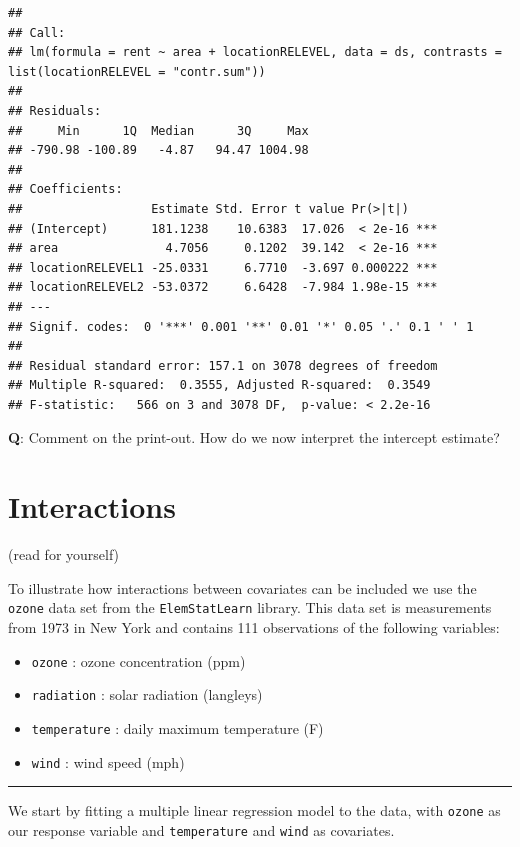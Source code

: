 \documentclass[
]{article}
\providecommand{\tightlist}{%
  \setlength{\itemsep}{0pt}\setlength{\parskip}{0pt}}
\begin{document}
\begin{verbatim}
## 
## Call:
## lm(formula = rent ~ area + locationRELEVEL, data = ds, contrasts = list(locationRELEVEL = "contr.sum"))
## 
## Residuals:
##     Min      1Q  Median      3Q     Max 
## -790.98 -100.89   -4.87   94.47 1004.98 
## 
## Coefficients:
##                  Estimate Std. Error t value Pr(>|t|)    
## (Intercept)      181.1238    10.6383  17.026  < 2e-16 ***
## area               4.7056     0.1202  39.142  < 2e-16 ***
## locationRELEVEL1 -25.0331     6.7710  -3.697 0.000222 ***
## locationRELEVEL2 -53.0372     6.6428  -7.984 1.98e-15 ***
## ---
## Signif. codes:  0 '***' 0.001 '**' 0.01 '*' 0.05 '.' 0.1 ' ' 1
## 
## Residual standard error: 157.1 on 3078 degrees of freedom
## Multiple R-squared:  0.3555, Adjusted R-squared:  0.3549 
## F-statistic:   566 on 3 and 3078 DF,  p-value: < 2.2e-16
\end{verbatim}

\textbf{Q}: Comment on the print-out. How do we now interpret the
intercept estimate?

\hypertarget{interactions}{%
\section{Interactions}\label{interactions}}

(read for yourself)

To illustrate how interactions between covariates can be included we use
the \texttt{ozone} data set from the \texttt{ElemStatLearn} library.
This data set is measurements from 1973 in New York and contains 111
observations of the following variables:

\begin{itemize}
\tightlist
\item
  \texttt{ozone} : ozone concentration (ppm)
\item
  \texttt{radiation} : solar radiation (langleys)
\item
  \texttt{temperature} : daily maximum temperature (F)
\item
  \texttt{wind} : wind speed (mph)
\end{itemize}

\begin{center}\rule{0.5\linewidth}{0.5pt}\end{center}

We start by fitting a multiple linear regression model to the data, with
\texttt{ozone} as our response variable and \texttt{temperature} and
\texttt{wind} as covariates.
\end{document}
